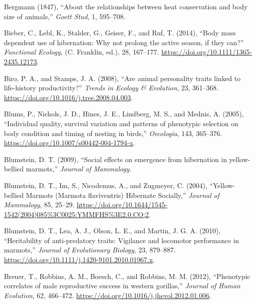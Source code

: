 \documentclass[
  12pt,
  letterpaper,
]{scrartcl}
\newlength{\cslhangindent}
\newenvironment{CSLReferences}[2] %
 {\begin{list}{}{%
  \setlength{\itemindent}{0pt}
  \setlength{\leftmargin}{0pt}
  \setlength{\parsep}{0pt}
  \ifodd #1
   \setlength{\leftmargin}{\cslhangindent}
   \setlength{\itemindent}{-1\cslhangindent}
  \fi
  \setlength{\itemsep}{#2\baselineskip}}}
 {\end{list}}
\begin{document}
\begin{CSLReferences}{1}{0}
Bergmann (1847), {``About the relationships between heat conservation
and body size of animals,''} \emph{Goett Stud}, 1, 595--708.

Bieber, C., Lebl, K., Stalder, G., Geiser, F., and Ruf, T. (2014),
{``Body mass dependent use of hibernation: {Why} not prolong the active
season, if they can?''} \emph{Functional Ecology}, (C. Franklin, ed.),
28, 167--177. \url{https://doi.org/10.1111/1365-2435.12173}.

Biro, P. A., and Stamps, J. A. (2008), {``Are animal personality traits
linked to life-history productivity?''} \emph{Trends in Ecology \&
Evolution}, 23, 361--368.
\url{https://doi.org/10.1016/j.tree.2008.04.003}.

Blums, P., Nichols, J. D., Hines, J. E., Lindberg, M. S., and Mednis, A.
(2005), {``Individual quality, survival variation and patterns of
phenotypic selection on body condition and timing of nesting in
birds,''} \emph{Oecologia}, 143, 365--376.
\url{https://doi.org/10.1007/s00442-004-1794-x}.

Blumstein, D. T. (2009), {``Social effects on emergence from hibernation
in yellow-bellied marmots,''} \emph{Journal of Mammalogy}.

Blumstein, D. T., Im, S., Nicodemus, A., and Zugmeyer, C. (2004),
{``Yellow-bellied {Marmots} ({Marmota} flaviventris) {Hibernate
Socially},''} \emph{Journal of Mammalogy}, 85, 25--29.
\url{https://doi.org/10.1644/1545-1542(2004)085\%3C0025:YMMFHS\%3E2.0.CO;2}.

Blumstein, D. T., Lea, A. J., Olson, L. E., and Martin, J. G. A. (2010),
{``Heritability of anti-predatory traits: {Vigilance} and locomotor
performance in marmots,''} \emph{Journal of Evolutionary Biology}, 23,
879--887. \url{https://doi.org/10.1111/j.1420-9101.2010.01967.x}.

Breuer, T., Robbins, A. M., Boesch, C., and Robbins, M. M. (2012),
{``Phenotypic correlates of male reproductive success in western
gorillas,''} \emph{Journal of Human Evolution}, 62, 466--472.
\url{https://doi.org/10.1016/j.jhevol.2012.01.006}.


\end{CSLReferences}
\end{document}
